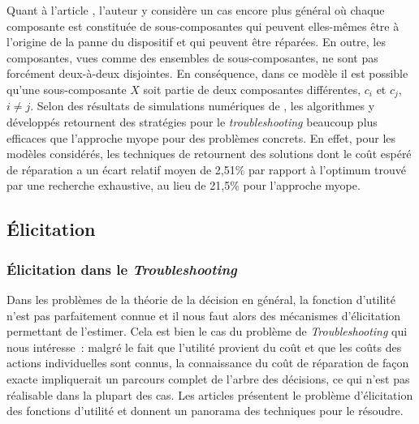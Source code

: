 \documentclass[a4paper,11pt]{article}
\theoremstyle{plain}
\begin{document}
Quant à l'article \cite{Langseth_2003}, l'auteur y considère un cas encore plus général où chaque composante est constituée de sous-composantes qui peuvent elles-mêmes être à l'origine de la panne du dispositif et qui peuvent être réparées. En outre, les composantes, vues comme des ensembles de sous-composantes, ne sont pas forcément deux-à-deux disjointes. En conséquence, dans ce modèle il est possible qu'une sous-composante $X$ soit partie de deux composantes différentes, $c_i$ et $c_j$, $i \neq j$. Selon des résultats de simulations numériques de \cite{Langseth_2003}, les algorithmes y développés retournent des stratégies pour le \emph{troubleshooting} beaucoup plus efficaces que l'approche myope pour des problèmes concrets. En effet, pour les modèles considérés, les techniques de \cite{Jensen_2001, Langseth_2003} retournent des solutions dont le coût espéré de réparation a un écart relatif moyen de 2,51\% par rapport à l'optimum trouvé par une recherche exhaustive, au lieu de 21,5\% pour l'approche myope.

\subsection{Élicitation}
\label{SecElicitation}

\subsubsection{Élicitation dans le \emph{Troubleshooting}}
\label{SecElicitationTroubleshooting}

Dans les problèmes de la théorie de la décision en général, la fonction d'utilité n'est pas parfaitement connue et il nous faut alors des mécanismes d'élicitation permettant de l'estimer. Cela est bien le cas du problème de \emph{Troubleshooting} qui nous intéresse~: malgré le fait que l'utilité provient du coût et que les coûts des actions individuelles sont connus, la connaissance du coût de réparation de façon exacte impliquerait un parcours complet de l'arbre des décisions, ce qui n'est pas réalisable dans la plupart des cas. Les articles \cite{Braziunas_2008, braziunas_local_2005} présentent le problème d'élicitation des fonctions d'utilité et donnent un panorama des techniques pour le résoudre.
\end{document}
